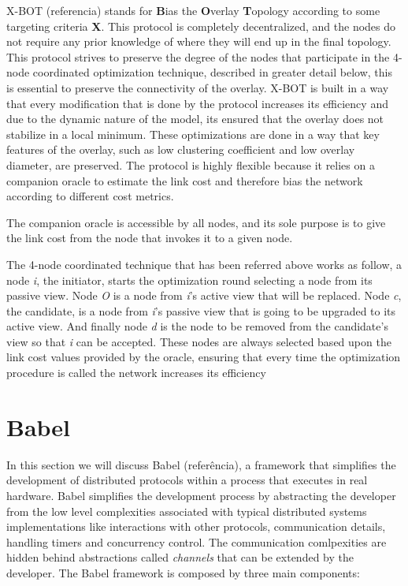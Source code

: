 X-BOT (referencia) stands for \textbf{B}ias the \textbf{O}verlay \textbf{T}opology
according to some targeting criteria \textbf{X}. This protocol is completely decentralized,
and the nodes do not require any prior knowledge of where they will end up in the final topology. 
This protocol strives to preserve the degree of the nodes that participate in the 4-node coordinated
optimization technique, described in greater detail below, this is essential to preserve
the connectivity of the overlay. X-BOT is built in a way that every modification that is
done by the protocol increases its efficiency and due to the dynamic nature of the model,
its ensured that the overlay does not stabilize in a local minimum. These optimizations
are done in a way that key features of the overlay, such as low clustering coefficient and
low overlay diameter, are preserved. The protocol is highly flexible because it relies on a
companion oracle to estimate the link cost and therefore bias the network according to
different cost metrics.

The companion oracle is accessible by all nodes, and its sole purpose is to give the
link cost from the node that invokes it to a given node.

The 4-node coordinated technique that has been referred above works as follow, a
node \textit{i}, the initiator, starts the optimization round selecting a node from
its passive view. Node \textit{O} is a node from \textit{i}'s active view that
will be replaced. Node \textit{c}, the candidate, is a node from \textit{i}'s passive
view that is going to be upgraded to its active view. And finally node \textit{d}
is the node to be removed from the candidate's view so that \textit{i} can be accepted.
These nodes are always selected based upon the link cost values provided by the oracle,
ensuring that every time the optimization procedure is called the network increases its
efficiency

\section{Babel}
\label{sec:babel}

In this section we will discuss Babel (referência), a framework that simplifies the
development of distributed protocols within a process that executes in real hardware.
Babel simplifies the development process by abstracting the developer from the
low level complexities associated with typical distributed systems implementations like
interactions with other protocols, communication details, handling timers and concurrency control.
The communication comlpexities are hidden behind abstractions called \textit{channels}
that can be extended by the developer. The Babel framework is composed by three main components:

